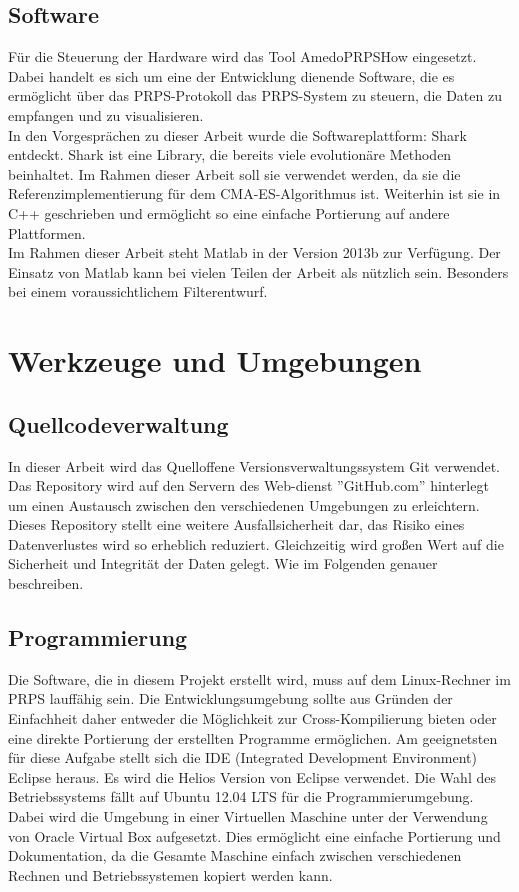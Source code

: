 \documentclass[a4paper,12pt,fleqn]{article}
\begin{document}
\subsection{Software}
Für die Steuerung der Hardware wird das Tool AmedoPRPSHow eingesetzt. Dabei handelt es sich um eine der Entwicklung dienende Software, die es ermöglicht über das PRPS-Protokoll das PRPS-System zu steuern, die Daten zu empfangen und zu visualisieren.\\
In den Vorgesprächen zu dieser Arbeit wurde die Softwareplattform: Shark entdeckt. Shark ist eine Library, die bereits viele evolutionäre Methoden beinhaltet. Im Rahmen dieser Arbeit soll sie verwendet werden, da sie die Referenzimplementierung für dem CMA-ES-Algorithmus ist. Weiterhin ist sie in C++ geschrieben und ermöglicht so eine einfache Portierung auf andere Plattformen.\\
Im Rahmen dieser Arbeit steht Matlab in der Version 2013b zur Verfügung. Der Einsatz von Matlab kann bei vielen Teilen der Arbeit als nützlich sein. Besonders bei einem voraussichtlichem Filterentwurf.  


\section{Werkzeuge und Umgebungen}
\subsection{Quellcodeverwaltung}
In dieser Arbeit wird das Quelloffene Versionsverwaltungssystem Git verwendet.
Das Repository wird auf den Servern des Web-dienst ''GitHub.com'' hinterlegt um
einen Austausch zwischen den verschiedenen Umgebungen zu erleichtern. Dieses
Repository stellt eine weitere Ausfallsicherheit dar, das Risiko eines
Datenverlustes wird so erheblich reduziert. Gleichzeitig wird großen Wert auf
die Sicherheit und Integrität der Daten gelegt. Wie im Folgenden
genauer beschreiben.

\subsection{Programmierung}
Die Software, die in diesem Projekt erstellt wird, muss auf dem Linux-Rechner im PRPS lauffähig sein. Die Entwicklungsumgebung sollte aus Gründen der Einfachheit daher entweder die Möglichkeit zur Cross-Kompilierung bieten oder eine direkte Portierung der erstellten Programme ermöglichen. Am geeignetsten für diese Aufgabe stellt sich die IDE (Integrated Development Environment) Eclipse heraus. Es wird die Helios Version von Eclipse verwendet. Die Wahl des Betriebssystems fällt auf Ubuntu 12.04 LTS für die Programmierumgebung. Dabei wird die Umgebung in einer Virtuellen Maschine unter der Verwendung von Oracle Virtual Box aufgesetzt. Dies ermöglicht eine einfache Portierung und Dokumentation, da die Gesamte Maschine einfach zwischen verschiedenen Rechnen und Betriebssystemen kopiert werden kann.
\end{document}
